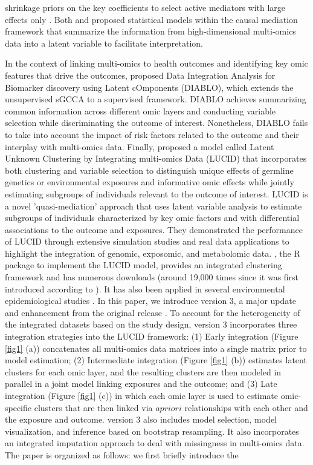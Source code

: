 shrinkage priors on the key coefficients to select active mediators with large effects only \citep{song2020bayesian}. Both \citet{albert2016causal} and \citet{derkach2019high} proposed statistical models within the causal mediation framework that summarize the information from high-dimensional multi-omics data into a latent variable to facilitate interpretation. 

In the context of linking multi-omics to health outcomes and identifying key omic features that drive the outcomes, \citet{singh2019diablo} proposed Data Integration Analysis for Biomarker discovery using Latent cOmponents (DIABLO), which extends the unsupervised sGCCA to a supervised framework. DIABLO achieves summarizing common information across different omic layers and conducting variable selection while discriminating the outcome of interest. Nonetheless, DIABLO fails to take into account the impact of risk factors related to the outcome and their interplay with multi-omics data. Finally, \citet{peng2020latent} proposed a model called Latent Unknown Clustering by Integrating multi-omics Data (LUCID) that incorporates both clustering and variable selection to distinguish unique effects of germline genetics or environmental exposures and informative omic effects while jointly estimating subgroups of individuals relevant to the outcome of interest. LUCID is a novel 'quasi-mediation' approach that uses latent variable analysis to estimate subgroups of individuals characterized by key omic factors and with differential associations to the outcome and exposures. They demonstrated the performance of LUCID through extensive simulation studies and real data applications to highlight the integration of genomic, exposomic, and metabolomic data. , the R package to implement the LUCID model, provides an integrated clustering framework and has numerous downloads (around 19,000 times since it was first introduced according to  \citep{yu2022dlstats}). It has also been applied in several environmental epidemiological studies \citep{jin2020perfluoroalkyl, stratakis2020prenatal, matta2022associations}. In this paper, we introduce  version 3, a major update and enhancement from the original release \citep{LUCIDus}. To account for the heterogeneity of the integrated datasets based on the study design,  version 3 incorporates three integration strategies into the LUCID framework: (1) Early integration (Figure \ref{fig1} (a)) concatenates all multi-omics data matrices into a single matrix prior to model estimation; (2) Intermediate integration (Figure \ref{fig1} (b)) estimates latent clusters for each omic layer, and the resulting clusters are then modeled in parallel in a joint model linking exposures and the outcome; and (3) Late integration (Figure \ref{fig1} (c)) in which each omic layer is used to estimate omic-specific clusters that are then linked via $a priori$ relationships with each other and the exposure and outcome.  version 3 also includes model selection, model visualization, and inference based on bootstrap resampling. It also incorporates an integrated imputation approach to deal with missingness in multi-omics data. The paper is organized as follows: we first briefly introduce the 
